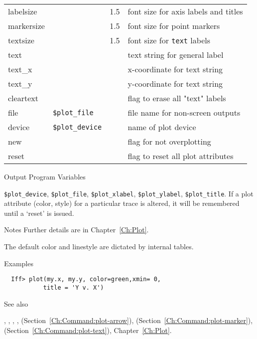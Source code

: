 \begin{IFFcom}
\begin{tabular}{llrl}
    {labelsize}  &   &1.5 & {font size for axis labels and titles}\\
    {markersize} &   &1.5 & {font size for point markers}\\
    {textsize}   &   &1.5 & {font size for {\tt{text}} labels}\\
    {text}      &   & & {text string for general label} \\ 
    {text\_x}   &   & & {x-coordinate for text string} \\ 
    {text\_y}   &   & & {y-coordinate for text string} \\ 
    {cleartext} &   & & {flag to erase all "text" labels} \\ 
    \noalign{\smallskip}
    {file}      & {\tt{\$plot\_file}} & & {file name for non-screen
      outputs} \\ 
    {device}    & {\tt{\$plot\_device}} & & {name of plot device}\\
    {new}       &   & & {flag for not overplotting} \\ 
    {reset}     &   & & {flag to reset all plot attributes}\\
  \end{tabular}
  \noindent   
  
\item[Output Program Variables] 
  \begin{sloppypar} 
    {\tt{\$plot\_device}}, {\tt{\$plot\_file}}, {\tt{\$plot\_xlabel}},
    {\tt{\$plot\_ylabel}}, {\tt{\$plot\_title}}.  If a plot attribute
    (color, style) for a particular trace is altered, it will be remembered
    until a `reset' is issued.
  \end{sloppypar}
\item[Notes]   Further details are in Chapter~{\ref{Ch:Plot}}.

  The default color and linestyle are dictated by internal tables.

\item[Examples] {\hspace{1.in} \vspace{-0.1truein} \relax }
\begin{verbatim} 
  Iff> plot(my.x, my.y, color=green,xmin= 0, 
           title = 'Y v. X')
\end{verbatim} \noindent %
\item[See also] 
  \begin{sloppypar} 
    {}, {},
    {}, {}, 
    {} (Section~\ref{Ch:Command:plot-arrow}), 
    {} (Section~\ref{Ch:Command:plot-marker}), 
    {} (Section~\ref{Ch:Command:plot-text}), 
    Chapter~{\ref{Ch:Plot}}.
  \end{sloppypar} 
\end{IFFcom}

